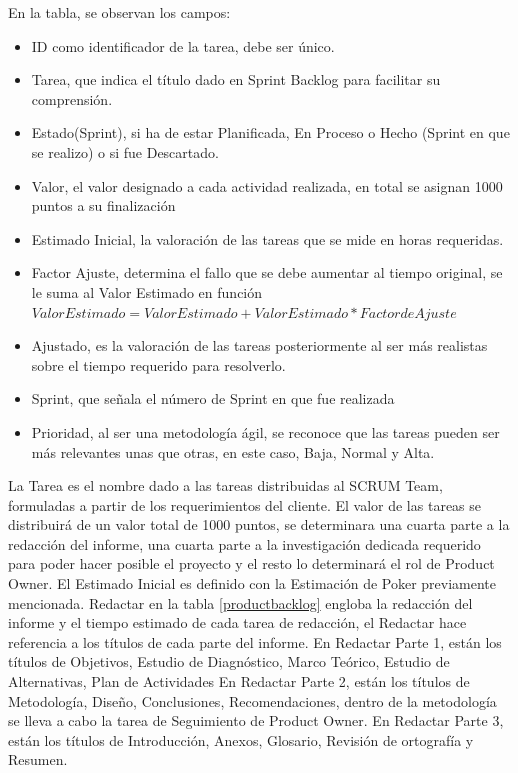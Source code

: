 En la tabla, se observan los campos:
\begin{itemize}
	\item ID como identificador de la tarea, debe ser único.
	\item Tarea, que indica el título dado en Sprint Backlog para facilitar su comprensión.
	\item Estado(Sprint), si ha de estar Planificada, En Proceso o Hecho (Sprint en que se realizo) o si fue Descartado.
	\item Valor, el valor designado a cada actividad realizada, en total se asignan 1000 puntos a su finalización
	\item Estimado Inicial, la valoración de las tareas que se mide en horas requeridas.
	\item Factor Ajuste, determina el fallo que se debe aumentar al tiempo original, se le suma al Valor Estimado en función $Valor Estimado = Valor Estimado + Valor Estimado * Factor de Ajuste$
	\item Ajustado, es la valoración de las tareas posteriormente al ser más realistas sobre el tiempo requerido para resolverlo.
	\item Sprint, que señala el número de Sprint en que fue realizada
	\item Prioridad, al ser una metodología ágil, se reconoce que las tareas pueden ser más relevantes unas que otras, en este caso, Baja, Normal y Alta.

\end{itemize}
La Tarea es el nombre dado a las tareas distribuidas al SCRUM Team, formuladas a partir de los requerimientos del cliente.
El valor de las tareas se distribuirá de un valor total de 1000 puntos, se determinara una cuarta parte a la redacción del informe, una cuarta parte a la investigación dedicada requerido para poder hacer posible el proyecto y el resto lo determinará el rol de Product Owner.
El Estimado Inicial es definido con la Estimación de Poker previamente mencionada.
Redactar en la tabla \ref{productbacklog} engloba la redacción del informe y el tiempo estimado de cada tarea de redacción, el Redactar hace referencia a los títulos de cada parte del informe.
En Redactar Parte 1, están los títulos de Objetivos, Estudio de Diagnóstico, Marco Teórico, Estudio de Alternativas, Plan de Actividades
En Redactar Parte 2, están los títulos de Metodología, Diseño, Conclusiones, Recomendaciones, dentro de la metodología se lleva a cabo la tarea de Seguimiento de Product Owner.
En Redactar Parte 3, están los títulos de Introducción, Anexos, Glosario, Revisión de ortografía y Resumen.
